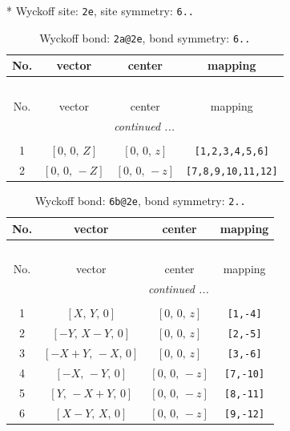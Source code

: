 \documentclass[fleqn,8pt]{jsarticle}
\begin{document}
* Wyckoff site: {\tt 2e}, site symmetry: {\tt 6..}
\renewcommand{\arraystretch}{1.2}
\begin{longtable}{cccc}
\caption{Wyckoff bond: {\tt 2a@2e}, bond symmetry: {\tt 6..}}
 \\
 \hline \hline
No. & vector & center & mapping \\ \hline \endfirsthead

\multicolumn{3}{l}{\tablename\ \thetable{}} \\
 \hline \hline
No. & vector & center & mapping \\ \hline \endhead

 \hline \hline
\multicolumn{3}{r}{\footnotesize\it continued ...} \\ \endfoot

 \hline \hline
\multicolumn{3}{r}{} \\ \endlastfoot

1 & $\left[ 0,\, 0,\, Z \right]$ & $\left[ 0,\, 0,\, z \right]$ & {\tt [1,2,3,4,5,6]} \\ \hline
2 & $\left[ 0,\, 0,\, - Z \right]$ & $\left[ 0,\, 0,\, - z \right]$ & {\tt [7,8,9,10,11,12]} \\
\end{longtable}
\renewcommand{\arraystretch}{1.2}
\begin{longtable}{cccc}
\caption{Wyckoff bond: {\tt 6b@2e}, bond symmetry: {\tt 2..}}
 \\
 \hline \hline
No. & vector & center & mapping \\ \hline \endfirsthead

\multicolumn{3}{l}{\tablename\ \thetable{}} \\
 \hline \hline
No. & vector & center & mapping \\ \hline \endhead

 \hline \hline
\multicolumn{3}{r}{\footnotesize\it continued ...} \\ \endfoot

 \hline \hline
\multicolumn{3}{r}{} \\ \endlastfoot

1 & $\left[ X,\, Y,\, 0 \right]$ & $\left[ 0,\, 0,\, z \right]$ & {\tt [1,-4]} \\ \hline
2 & $\left[ - Y,\, X - Y,\, 0 \right]$ & $\left[ 0,\, 0,\, z \right]$ & {\tt [2,-5]} \\ \hline
3 & $\left[ - X + Y,\, - X,\, 0 \right]$ & $\left[ 0,\, 0,\, z \right]$ & {\tt [3,-6]} \\ \hline
4 & $\left[ - X,\, - Y,\, 0 \right]$ & $\left[ 0,\, 0,\, - z \right]$ & {\tt [7,-10]} \\ \hline
5 & $\left[ Y,\, - X + Y,\, 0 \right]$ & $\left[ 0,\, 0,\, - z \right]$ & {\tt [8,-11]} \\ \hline
6 & $\left[ X - Y,\, X,\, 0 \right]$ & $\left[ 0,\, 0,\, - z \right]$ & {\tt [9,-12]} \\
\end{longtable}
\end{document}
